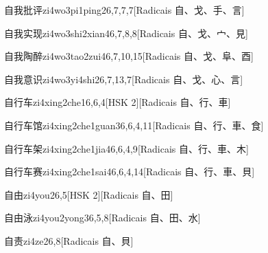 \begin{entry}{自我批评}{zi4wo3pi1ping2}{6,7,7,7}[Radicais ⾃、⼽、⼿、⾔]
\end{entry}

\begin{entry}{自我实现}{zi4wo3shi2xian4}{6,7,8,8}[Radicais ⾃、⼽、⼧、⾒]
\end{entry}

\begin{entry}{自我陶醉}{zi4wo3tao2zui4}{6,7,10,15}[Radicais ⾃、⼽、⾩、⾣]
\end{entry}

\begin{entry}{自我意识}{zi4wo3yi4shi2}{6,7,13,7}[Radicais ⾃、⼽、⼼、⾔]
\end{entry}

\begin{entry}{自行车}{zi4xing2che1}{6,6,4}[HSK 2][Radicais ⾃、⾏、⾞]
\end{entry}

\begin{entry}{自行车馆}{zi4xing2che1guan3}{6,6,4,11}[Radicais ⾃、⾏、⾞、⾷]
\end{entry}

\begin{entry}{自行车架}{zi4xing2che1jia4}{6,6,4,9}[Radicais ⾃、⾏、⾞、⽊]
\end{entry}

\begin{entry}{自行车赛}{zi4xing2che1sai4}{6,6,4,14}[Radicais ⾃、⾏、⾞、⾙]
\end{entry}

\begin{entry}{自由}{zi4you2}{6,5}[HSK 2][Radicais ⾃、⽥]
\end{entry}

\begin{entry}{自由泳}{zi4you2yong3}{6,5,8}[Radicais ⾃、⽥、⽔]
\end{entry}

\begin{entry}{自责}{zi4ze2}{6,8}[Radicais ⾃、⾙]
\end{entry}

